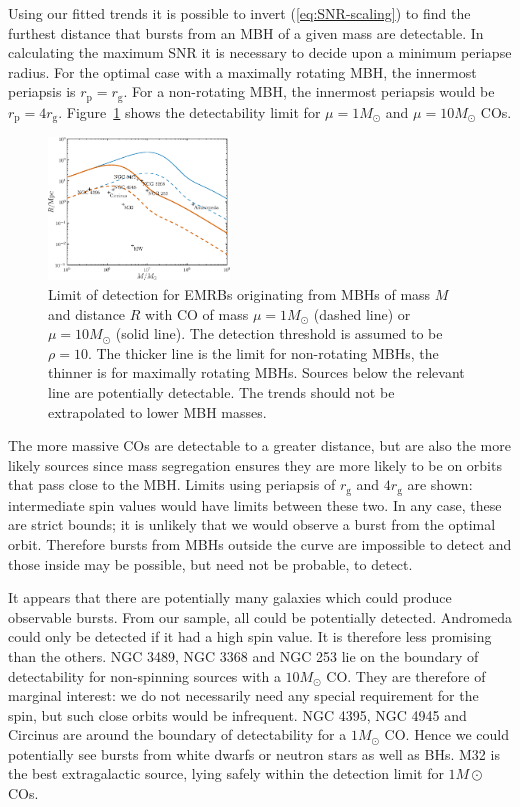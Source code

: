 \documentclass[useAMS,usedcolumn,usegraphicx,usenatbib]{mn2e}
\newcommand{\eqnref}[1]{(\ref{eq:#1})}
\newcommand{\Figref}[1]{Figure~\ref{fig:#1}}
\newcommand{\sub}[1]{\ensuremath{_\mathrm{#1}}}
\begin{document}
Using our fitted trends it is possible to invert \eqnref{SNR-scaling} to find the furthest distance that bursts from an MBH of a given mass are detectable. In calculating the maximum SNR it is necessary to decide upon a minimum periapse radius. For the optimal case with a maximally rotating MBH, the innermost periapsis is $r\sub{p} = r\sub{g}$. For a non-rotating MBH, the innermost periapsis would be $r\sub{p} = 4r\sub{g}$. \Figref{detect} shows the detectability limit for $\mu = 1 M_\odot$ and $\mu = 10 M_\odot$ COs.
\begin{figure}
\begin{center}
 \includegraphics[width=0.43\textwidth]{Fig_M_R_detect_1}
 \caption{Limit of detection for EMRBs originating from MBHs of mass $M$ and distance $R$ with CO of mass $\mu = 1 M_\odot$ (dashed line) or $\mu = 10 M_\odot$ (solid line). The detection threshold is assumed to be $\rho = 10$. The thicker line is the limit for non-rotating MBHs, the thinner is for maximally rotating MBHs. Sources below the relevant line are potentially detectable. The trends should not be extrapolated to lower MBH masses.\label{fig:detect}}
   \end{center}
\end{figure}
The more massive COs are detectable to a greater distance, but are also the more likely sources since mass segregation ensures they are more likely to be on orbits that pass close to the MBH. Limits using periapsis of $r\sub{g}$ and $4r\sub{g}$ are shown: intermediate spin values would have limits between these two. In any case, these are strict bounds; it is unlikely that we would observe a burst from the optimal orbit. Therefore bursts from MBHs outside the curve are impossible to detect and those inside may be possible, but need not be probable, to detect.

It appears that there are potentially many galaxies which could produce observable bursts. From our sample, all could be potentially detected. Andromeda could only be detected if it had a high spin value. It is therefore less promising than the others. NGC 3489, NGC 3368 and NGC 253 lie on the boundary of detectability for non-spinning sources with a $10 M_\odot$ CO. They are therefore of marginal interest: we do not necessarily need any special requirement for the spin, but such close orbits would be infrequent. NGC 4395, NGC 4945 and Circinus are around the boundary of detectability for a $1 M_\odot$ CO. Hence we could potentially see bursts from white dwarfs or neutron stars as well as BHs. M32 is the best extragalactic source, lying safely within the detection limit for $1 M\odot$ COs.
\end{document}
